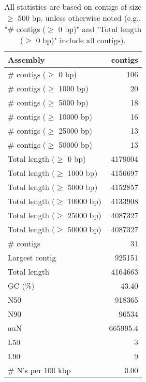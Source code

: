 \documentclass[12pt,a4paper]{article}
\begin{document}
\begin{table}[ht]
\begin{center}
\caption{All statistics are based on contigs of size $\geq$ 500 bp, unless otherwise noted (e.g., "\# contigs ($\geq$ 0 bp)" and "Total length ($\geq$ 0 bp)" include all contigs).}
\begin{tabular}{|l*{1}{|r}|}
\hline
Assembly & contigs \\ \hline
\# contigs ($\geq$ 0 bp) & 106 \\ \hline
\# contigs ($\geq$ 1000 bp) & 20 \\ \hline
\# contigs ($\geq$ 5000 bp) & 18 \\ \hline
\# contigs ($\geq$ 10000 bp) & 16 \\ \hline
\# contigs ($\geq$ 25000 bp) & 13 \\ \hline
\# contigs ($\geq$ 50000 bp) & 13 \\ \hline
Total length ($\geq$ 0 bp) & 4179004 \\ \hline
Total length ($\geq$ 1000 bp) & 4156697 \\ \hline
Total length ($\geq$ 5000 bp) & 4152857 \\ \hline
Total length ($\geq$ 10000 bp) & 4133908 \\ \hline
Total length ($\geq$ 25000 bp) & 4087327 \\ \hline
Total length ($\geq$ 50000 bp) & 4087327 \\ \hline
\# contigs & 31 \\ \hline
Largest contig & 925151 \\ \hline
Total length & 4164663 \\ \hline
GC (\%) & 43.40 \\ \hline
N50 & 918365 \\ \hline
N90 & 96534 \\ \hline
auN & 665995.4 \\ \hline
L50 & 3 \\ \hline
L90 & 9 \\ \hline
\# N's per 100 kbp & 0.00 \\ \hline
\end{tabular}
\end{center}
\end{table}
\end{document}
